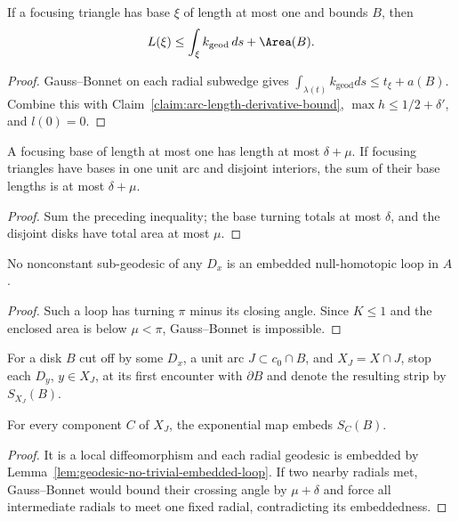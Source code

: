 \begin{lemma}
\label{lem:focusing-triangle-base-length-bound}
\label{laest}
If a focusing triangle has base $\xi$ of length at most one and bounds $B$,
then
\[
L(\xi)\le\int_\xi k_{\mathrm{geod}}\,ds+\Area(B).
\]
\end{lemma}
\begin{proof}
\sketch Gauss--Bonnet on each radial subwedge gives
$\int_{\lambda(t)}k_{\mathrm{geod}}ds\le t_\xi+a(B)$. Combine this with
Claim~\ref{claim:arc-length-derivative-bound},
$\max h\le1/2+\delta'$, and $l(0)=0$.
\end{proof}

\begin{corollary}
\label{cor:focusing-triangle-base-bound-collection}
\label{muepsbd}
A focusing base of length at most one has length at most $\delta+\mu$. If
focusing triangles have bases in one unit arc and disjoint interiors, the sum
of their base lengths is at most $\delta+\mu$.
\end{corollary}
\begin{proof}
\sketch Sum the preceding inequality; the base turning totals at most $\delta$, and
the disjoint disks have total area at most $\mu$.
\end{proof}

\begin{lemma}
\label{lem:geodesic-no-trivial-embedded-loop}
\label{noloops}
No nonconstant sub-geodesic of any $D_x$ is an embedded null-homotopic loop in
$A$.
\end{lemma}
\begin{proof}
\sketch Such a loop has turning $\pi$ minus its closing angle. Since $K\le1$
and the enclosed area is below $\mu<\pi$, Gauss--Bonnet is impossible.
\end{proof}

For a disk $B$ cut off by some $D_x$, a unit arc $J\subset c_0\cap B$, and
$X_J=X\cap J$, stop each $D_y$, $y\in X_J$, at its first encounter with
$\partial B$ and denote the resulting strip by $S_{X_J}(B)$.

\begin{claim}
\label{claim:local-embedding-of-geodesic-family}
\label{locemb}
For every component $C$ of $X_J$, the exponential map embeds $S_C(B)$.
\end{claim}
\begin{proof}
\sketch It is a local diffeomorphism and each radial geodesic is embedded by
Lemma~\ref{lem:geodesic-no-trivial-embedded-loop}. If two nearby radials met,
Gauss--Bonnet would bound their crossing angle by $\mu+\delta$ and force all
intermediate radials to meet one fixed radial, contradicting its embeddedness.
\end{proof}

